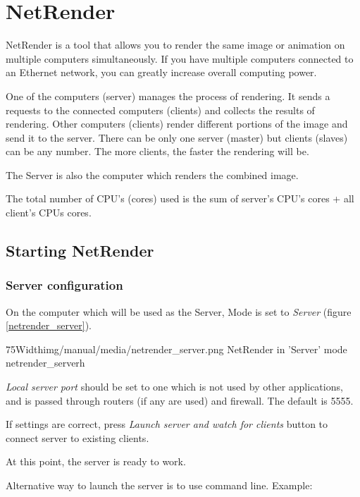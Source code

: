 \section{NetRender}\label{netrender}

NetRender is a tool that allows you to render the same image or animation on
multiple computers simultaneously. If you have multiple computers connected to
an Ethernet network, you can greatly increase overall computing power.

One of the computers (server) manages the process of rendering. It sends a
requests to the connected computers (clients) and collects the results of
rendering. Other computers (clients) render different portions of the image and
send it to the server. There can be only one server (master) but clients
(slaves) can be any number. The more clients, the faster the rendering will be.

The Server is also the computer which renders the combined image.

The total number of CPU's (cores) used is the sum of server's CPU's cores + all
client's CPUs cores.

\subsection{Starting NetRender}\label{starting-netrender}

\subsubsection{Server configuration}\label{server-configuration}

On the computer which will be used as the Server, Mode is set to \emph{Server} (figure \ref{netrender_server}).

\simpleImageWithCaption75Width{img/manual/media/netrender_server.png}
{NetRender in 'Server' mode}
{netrender_server}{h}

\emph{Local server port} should be set to one which is not used by other
applications, and is passed through routers (if any are used) and firewall. The
default is 5555.

If settings are correct, press \emph{Launch server and watch for clients} button
to connect server to existing clients.

At this point, the server is ready to work.

Alternative way to launch the server is to use command line. Example:

